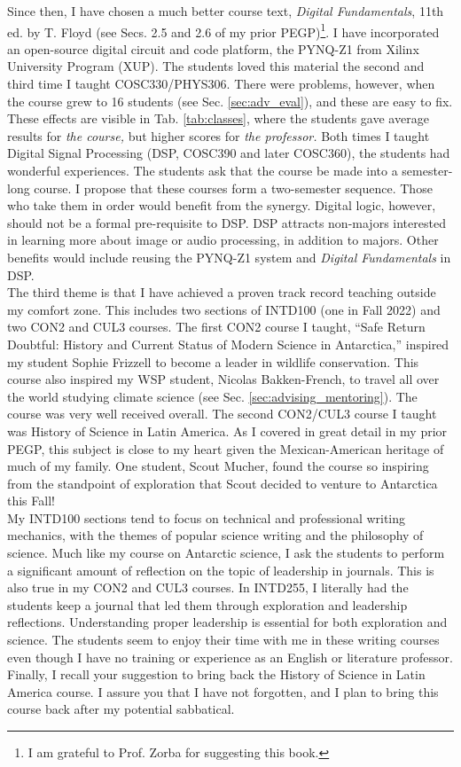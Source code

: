 \documentclass[../../../main.tex]{subfiles}
\begin{document}
Since then, I have chosen a much better course text, \textit{Digital Fundamentals}, 11th ed. by T. Floyd \cite{digitalFund} (see Secs. 2.5 and 2.6 of my prior PEGP)\footnote{I am grateful to Prof. Zorba for suggesting this book.}.  I have incorporated an open-source digital circuit and code platform, the PYNQ-Z1 from Xilinx University Program (XUP).  The students loved this material the second and third time I taught COSC330/PHYS306.  There were problems, however, when the course grew to 16 students (see Sec. \ref{sec:adv_eval}), and these are easy to fix.  These effects are visible in Tab. \ref{tab:classes}, where the students gave average results for \textit{the course,} but higher scores for \textit{the professor.}  Both times I taught Digital Signal Processing (DSP, COSC390 and later COSC360), the students had wonderful experiences.  The students ask that the course be made into a semester-long course.  I propose that these courses form a two-semester sequence.  Those who take them in order would benefit from the synergy.  Digital logic, however, should not be a formal pre-requisite to DSP.  DSP attracts non-majors interested in learning more about image or audio processing, in addition to majors.  Other benefits would include reusing the PYNQ-Z1 system and \textit{Digital Fundamentals} in DSP.
\\
\vspace{0.15cm}
The third theme is that I have achieved a proven track record teaching outside my comfort zone.  This includes two sections of INTD100 (one in Fall 2022) and two CON2 and CUL3 courses.  The first CON2 course I taught, ``Safe Return Doubtful: History and Current Status of Modern Science in Antarctica,'' inspired my student Sophie Frizzell to become a leader in wildlife conservation.  This course also inspired my WSP student, Nicolas Bakken-French, to travel all over the world studying climate science (see Sec. \ref{sec:advising_mentoring}).  The course was very well received overall.  The second CON2/CUL3 course I taught was History of Science in Latin America.  As I covered in great detail in my prior PEGP, this subject is close to my heart given the Mexican-American heritage of much of my family.  One student, Scout Mucher, found the course so inspiring from the standpoint of exploration that Scout decided to venture to Antarctica this Fall!
\\
\vspace{0.15cm}
My INTD100 sections tend to focus on technical and professional writing mechanics, with the themes of popular science writing and the philosophy of science.  Much like my course on Antarctic science, I ask the students to perform a significant amount of reflection on the topic of leadership in journals.  This is also true in my CON2 and CUL3 courses.  In INTD255, I literally had the students keep a journal that led them through exploration and leadership reflections.  Understanding proper leadership is essential for both exploration and science.  The students seem to enjoy their time with me in these writing courses even though I have no training or experience as an English or literature professor.  Finally, I recall your suggestion to bring back the History of Science in Latin America course.  I assure you that I have not forgotten, and I plan to bring this course back after my potential sabbatical.
\end{document}
